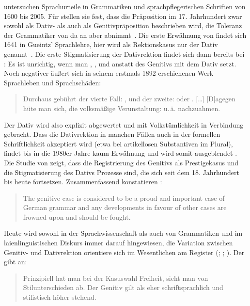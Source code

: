 \citet{Davies2006} untersuchen Sprachurteile in Grammatiken und sprachpflegerischen Schriften von 1600 bis 2005.
Für \wegen{} stellen sie fest, dass die Präposition im 17. Jahrhundert zwar sowohl als Dativ- als auch als Genitivpr{\"a}position beschrieben wird, die Toleranz der Grammatiker von da an aber abnimmt~\citep[s.][202]{Davies2006}.
Die erste Erwähnung von \wegen{} findet sich 1641 in Gueintz' Sprachlehre, hier wird als Rektionskasus nur der Dativ genannt~\citep[s.][209]{Davies2006}. 
Die erste Stigmatisierung der Dativrektion findet sich dann bereits bei \citet[245]{Heynatz.1777}: 
\glqq Es ist unrichtig, wenn man , ,  und \wegen{} anstatt des Genitivs mit dem Dativ setzt.\grqq
Noch negativer äußert sich \citet[]{Matthias.1929} in seinem erstmals 1892 erschienenen Werk \glqq Sprachleben und Sprachschäden\grqq:
\begin{quote} Durchaus gebührt  der vierte Fall: , und \wegen{} der zweite:  oder . […] [D]agegen hüte man sich, die volksmäßige Verunstaltung:  u.\,ä. nachzuahmen. \citep[141]{Matthias.1929} \end{quote}
Der Dativ wird also explizit abgewertet und mit Volkstümlichkeit in Verbindung gebracht. 
Dass die Dativrektion in manchen Fällen auch in der formellen Schriftlichkeit akzeptiert wird (etwa bei artikellosen Substantiven im Plural), findet bis in die 1980er Jahre kaum Erwähnung und wird somit ausgeblendet \citep[s.][205, 209]{Davies2006}. 
Die Studie von \citet[]{Davies2006} zeigt, dass die Registrierung des Genitivs als Prestigekasus und die Stigmatisierung des Dativs Prozesse sind, die sich seit dem 18. Jahrhundert bis heute fortsetzen. 
Zusammenfassend konstatieren \citeauthor{Davies2006}:\begin{quote}The genitive case is considered to be a proud and important case of German grammar and any developments in favour of other cases are frowned upon and should be fought. \citep[209]{Davies2006}\end{quote}
Heute wird sowohl in der Sprachwissenschaft als auch von Grammatiken und im laienlinguistischen Diskurs immer darauf hingewiesen, die Variation zwischen Genitiv- und Dativrektion orientiere sich im Wesentlichen am Register (\citealp[s. etwa][172]{Barbour1998}; \citealp[135]{Elter2005}; \citealp[182]{Eisenberg.2013}).  
Der \citeauthor{Duden2016} gibt an: \begin{quote}Prinzipiell hat man bei der Kasuswahl Freiheit, sieht man von Stilunterschieden ab. Der Genitiv gilt als eher schriftsprachlich und stilistisch h{\"o}her stehend.~\citep[{\S}910]{Duden2016}\end{quote}
